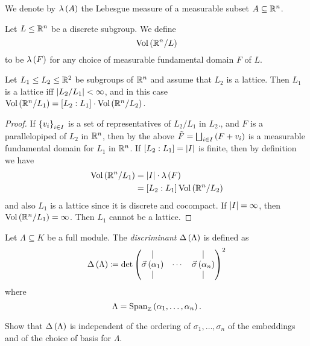 \documentclass[11pt]{article}
\begin{document}

\begin{notation}
We denote by $\lambda\left( A \right)$ the Lebesgue measure of a measurable subset $A \subseteq \mathbb{R}^n$.
\end{notation}

\begin{definition}
Let $L \leq \mathbb{R}^n$ be a discrete subgroup.
We define
\[\mathrm{Vol}\left( \mathbb{R}^n / L \right)\]
to be $\lambda\left( F \right)$ for any choice of measurable fundamental domain $F$ of $L$.
\end{definition}

\begin{corollary}
Let $L_1 \leq L_2 \leq \mathbb{R}^2$ be subgroups of $\mathbb{R}^n$ and assume that $L_2$ is a lattice. Then $L_1$ is a lattice iff $\left| L_2 / L_1 \right| < \infty$, and in this case $\operatorname{Vol}\left( \mathbb{R}^n / L_1 \right) = \left[ L_2 : L_1 \right] \cdot \mathrm{Vol}\left( \mathbb{R}^n / L_2 \right)$.
\end{corollary}

\begin{proof}
If $\set{v_i}_{i \in I}$ is a set of representatives of $L_2 / L_1$ in $L_2$., and $F$ is a parallelopiped of $L_2$ in $\mathbb{R}^n$, then by the above $\tilde{F} = \bigsqcup_{i \in I} \left( F + v_i \right)$ is a measurable fundamental domain for $L_1$ in $\mathbb{R}^n$. If $\left[ L_2 : L_1 \right] = \left| I \right|$ is finite, then by definition we have
\begin{align*}
\mathrm{Vol}\left( \mathbb{R}^n / L_1 \right) &= \left| I \right| \cdot \lambda\left( F \right) \\
&= \left[ L_2 : L_1 \right] \mathrm{Vol}\left( \mathbb{R}^n / L_2 \right)
\end{align*}
and also $L_1$ is a lattice since it is discrete and cocompact.
If $\left| I \right| = \infty$, then $\mathrm{Vol}\left( \mathbb{R}^n / L_1 \right) = \infty$. Then $L_1$ cannot be a lattice.
\end{proof}

\begin{definition}
Let $\Lambda \subseteq K$ be a full module. The \emph{discriminant} $\Delta\left( \Lambda \right)$ is defined as
\[\Delta\left( \Lambda \right) \coloneqq \det\begin{pmatrix}\vert & & \vert \\ \vec{\sigma}\left( \alpha_1 \right) & \cdots & \vec{\sigma}\left( \alpha_n \right) \\ \vert & & \vert\end{pmatrix}^2\]
where
\[\Lambda = \operatorname{Span}_{\mathbb{Z}}\left( \alpha_1, \ldots, \alpha_n \right) \text{.}\]
\end{definition}

\begin{exercise}
Show that $\Delta\left( \Lambda \right)$ is independent of the ordering of $\sigma_1, \ldots, \sigma_n$ of the embeddings and of the choice of basis for $\Lambda$.
\end{exercise}
\end{document}

